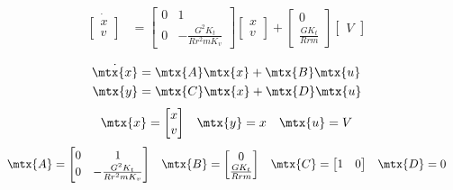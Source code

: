\begin{align*}
  \dot{\begin{bmatrix}
    x \\
    v
  \end{bmatrix}} &=
  \begin{bmatrix}
    0 & 1 \\
    0 & -\frac{G^2 K_t}{Rr^2 m K_v}
  \end{bmatrix}
  \begin{bmatrix}
    x \\
    v
  \end{bmatrix} +
  \begin{bmatrix}
    0 \\
    \frac{GK_t}{Rrm}
  \end{bmatrix}
  \begin{bmatrix}
    V
  \end{bmatrix}
\end{align*}

\begin{theorem}
  \begin{align*}
    \dot{\mtx{x}} &= \mtx{A} \mtx{x} + \mtx{B} \mtx{u} \\
    \mtx{y} &= \mtx{C} \mtx{x} + \mtx{D} \mtx{u}
  \end{align*}
  \begin{equation*}
    \begin{array}{ccc}
      \mtx{x} =
      \begin{bmatrix}
        x \\
        v
      \end{bmatrix} &
      \mtx{y} = x &
      \mtx{u} = V
    \end{array}
  \end{equation*}
  \begin{equation}
    \begin{array}{cccc}
      \mtx{A} =
      \begin{bmatrix}
        0 & 1 \\
        0 & -\frac{G^2 K_t}{Rr^2 mK_v}
      \end{bmatrix} &
      \mtx{B} =
      \begin{bmatrix}
        0 \\
        \frac{GK_t}{Rrm}
      \end{bmatrix} &
      \mtx{C} =
      \begin{bmatrix}
        1 & 0
      \end{bmatrix} &
      \mtx{D} = 0
    \end{array}
  \end{equation}
\end{theorem}

